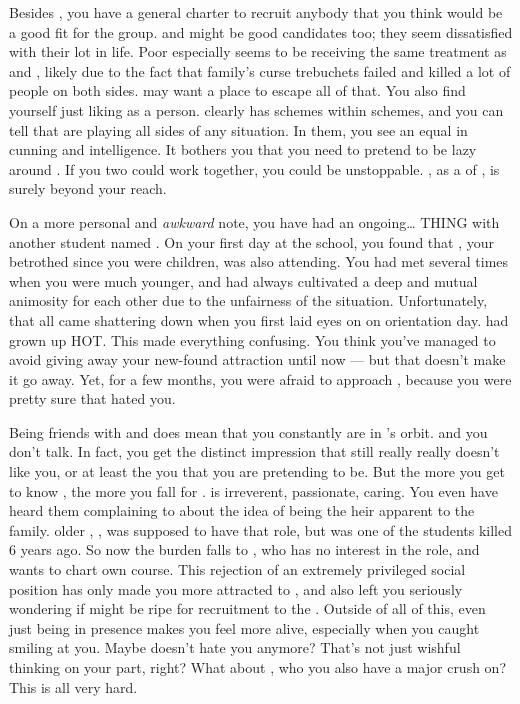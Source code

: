 \documentclass[char]{GL2020}
\begin{document}
 Besides \cAmbition{}, you have a general charter to recruit anybody that you think would be a good fit for the group. \cAdopted{} and \cLibAssist{} might be good candidates too; they seem dissatisfied with their lot in life. Poor \cLibAssist{} especially seems to be receiving the same treatment as \cWarlordDaughter{} and \cTechStar{}, likely due to the fact that \cLibAssist{\their} family’s curse trebuchets failed and killed a lot of people on both sides. \cLibAssist{\They} may want a place to escape all of that. You also find yourself just liking \cLibAssist{\them} as a person. \cLibAssist{} clearly has schemes within schemes, and you can tell that \cLibAssist{\they} are playing all sides of any situation.  In them, you see an equal in cunning and intelligence.  It bothers you that you need to pretend to be lazy around \cLibAssist{\them}.  If you two could work together, you could be unstoppable.  \cDisney{}, as a \cDisney{\cleric} of \cFarmGod{}, is surely beyond your reach.  
 
On a more personal and \emph{awkward} note, you have had an ongoing\ldots{} THING with another student named \cHeir{\full}. On your first day at the school, you found that \cHeir{}, your betrothed since you were children, was also attending. You had met several times when you were much younger, and had always cultivated a deep and mutual animosity for each other due to the unfairness of the situation. Unfortunately, that all came shattering down when you first laid eyes on \cHeir{\them} on orientation day. \cHeir{} had grown up HOT.  This made everything confusing.  You think you've managed to avoid giving away your new-found attraction until now — but that doesn't make it go away. Yet, for a few months, you were afraid to approach \cHeir{\them}, because you were pretty sure that \cHeir{\they} hated you.  

Being friends with \cAmbition{} and \cPresident{} does mean that you constantly are in \cHeir{}’s orbit.  \cHeir{} and you don’t talk.  In fact, you get the distinct impression that \cHeir{} still really really doesn’t like you, or at least the you that you are pretending to be. But the more you get to know \cHeir{\them}, the more you fall for \cHeir{\them}.  \cHeir{} is irreverent, passionate, caring. You even have heard them complaining to \cAmbition{} about the idea of being the heir apparent to the \cHeir{\formal} family. \cHeir{\Their} older \cHeirSibling{\sibling}, \cHeirSibling{}, was supposed to have that role, but \cHeirSibling{} was one of the students killed 6 years ago. So now the burden falls to \cHeir{}, who has no interest in the role, and wants to chart \cHeir{\their} own course. This rejection of an extremely privileged social position has only made you more attracted to \cHeir{\them}, and also left you seriously wondering if \cHeir{\they} might be ripe for recruitment to the \pGoaties{}.  Outside of all of this, even just being in \cHeirs{} presence makes you feel more alive, especially when you caught \cHeir{\them} smiling at you. Maybe \cHeir{} doesn’t hate you anymore?  That’s not just wishful thinking on your part, right? What about \cPresident{}, who you also have a major crush on?  This is all very hard. 
\end{document}
